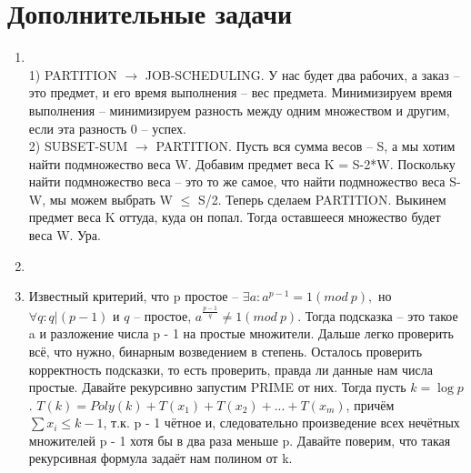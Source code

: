 \documentclass[12pt]{article}
\begin{document}
\section{Дополнительные задачи}

\begin{enumerate}
	\setlength{\parskip}{0pt} 
	\setlength{\itemsep}{0pt} 
	\item ~\\
    1) PARTITION $\to$ JOB-SCHEDULING. У нас будет два рабочих, а заказ -- это предмет, и его время выполнения -- вес предмета. Минимизируем 
    время выполнения -- минимизируем разность между одним множеством и другим, если эта разность 0 -- успех. \\
    2) SUBSET-SUM $\to$ PARTITION. Пусть вся сумма весов -- S, а мы хотим найти подмножество веса W. Добавим предмет веса K = S-2*W. 
    Поскольку найти подмножество веса -- это то же самое, что найти подмножество веса S-W, мы можем выбрать W $\le$ S/2. Теперь сделаем 
    PARTITION. Выкинем предмет веса K оттуда, куда он попал. Тогда оставшееся множество будет веса W. Ура. \\
    \item ~\\
    \item Известный критерий, что p простое -- $\exists a: a^{p - 1} = 1 (mod~p),$ но $\forall q : q | (p - 1)$ и $q$ -- простое, 
    $a^{\frac{p - 1}{q}} \ne 1 (mod~p)$. Тогда подсказка -- это такое a и разложение числа p - 1 на простые множители. Дальше легко проверить 
    всё, что нужно, бинарным возведением в степень. Осталось проверить корректность подсказки, то есть проверить, правда ли данные нам числа 
    простые. Давайте рекурсивно запустим PRIME от них. Тогда пусть $k = \log p$. $T(k) = Poly(k) + T(x_1) + T(x_2) + ... + T(x_m)$, причём 
    $\sum x_i \le k - 1$, т.к. p - 1 чётное и, следовательно произведение всех нечётных множителей p - 1 хотя бы в два раза меньше p. Давайте 
    поверим, что такая рекурсивная формула задаёт нам полином от k. \\
\end{enumerate}
\end{document}

